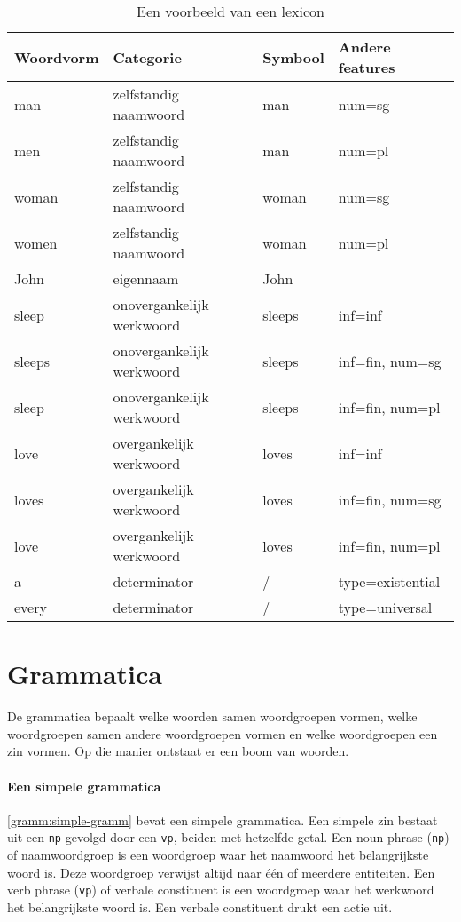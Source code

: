 \begin{table}[!]
  \centering
  \begin{tabular}{@{}llll@{}}
    \toprule
    \textbf{Woordvorm} & \textbf{Categorie} & \textbf{Symbool} & \textbf{Andere features} \\ \midrule
    man                & zelfstandig naamwoord     & man     & num=sg            \\
    men                & zelfstandig naamwoord     & man     & num=pl            \\
    woman              & zelfstandig naamwoord     & woman   & num=sg            \\
    women              & zelfstandig naamwoord     & woman   & num=pl            \\
    John               & eigennaam                 & John    &                   \\
    sleep              & onovergankelijk werkwoord & sleeps  & inf=inf           \\
    sleeps             & onovergankelijk werkwoord & sleeps  & inf=fin, num=sg   \\
    sleep              & onovergankelijk werkwoord & sleeps  & inf=fin, num=pl   \\
    love               & overgankelijk werkwoord   & loves   & inf=inf           \\
    loves              & overgankelijk werkwoord   & loves   & inf=fin, num=sg   \\
    love               & overgankelijk werkwoord   & loves   & inf=fin, num=pl   \\
    a                  & determinator              & /       & type=existential  \\
    every              & determinator              & /       & type=universal    \\
    \bottomrule
  \end{tabular}
  \caption{Een voorbeeld van een lexicon}
  \label{tbl:lexicon}
\end{table}

\section{Grammatica}
De grammatica bepaalt welke woorden samen woordgroepen vormen, welke woordgroepen samen andere woordgroepen vormen en welke woordgroepen een zin vormen. Op die manier ontstaat er een boom van woorden.

\paragraph{Een simpele grammatica} \autoref{gramm:simple-gramm} bevat een simpele grammatica. Een simpele zin bestaat uit een \texttt{np} gevolgd door een \texttt{vp}, beiden met hetzelfde getal. Een noun phrase (\texttt{np}) of naamwoordgroep is een woordgroep waar het naamwoord het belangrijkste woord is. Deze woordgroep verwijst altijd naar één of meerdere entiteiten. Een verb phrase (\texttt{vp}) of verbale constituent is een woordgroep waar het werkwoord het belangrijkste woord is. Een verbale constituent drukt een actie uit.

